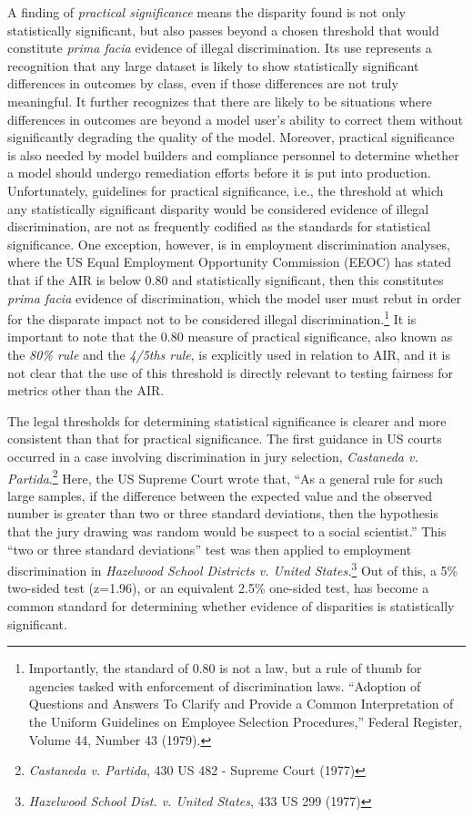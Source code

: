 \documentclass[information,article,submit,moreauthors,pdftex]{definitions/mdpi}
\begin{document}
A finding of \textit{practical significance} means the disparity found is not only statistically significant, but also passes beyond a chosen threshold that would constitute \textit{prima facia} evidence of illegal discrimination.  Its use represents a recognition that any large dataset is likely to show statistically significant differences in outcomes by class, even if those differences are not truly meaningful.  It further recognizes that there are likely to be situations where differences in outcomes are beyond a model user’s ability to correct them without significantly degrading the quality of the model. Moreover, practical significance is also needed by model builders and compliance personnel to determine whether a model should undergo remediation efforts before it is put into production. Unfortunately, guidelines for practical significance, i.e., the threshold at which any statistically significant disparity would be considered evidence of illegal discrimination, are not as frequently codified as the standards for statistical significance.  One exception, however, is in employment discrimination analyses, where the US Equal Employment Opportunity Commission (EEOC) has stated that if the AIR is below 0.80 and statistically significant, then this constitutes \textit{prima facia} evidence of discrimination, which the model user must rebut in order for the disparate impact not to be considered illegal discrimination.\footnote{Importantly, the standard of 0.80 is not a law, but a rule of thumb for agencies tasked with enforcement of discrimination laws.  ``Adoption of Questions and Answers To Clarify and Provide a Common Interpretation of the Uniform Guidelines on Employee Selection Procedures,'' Federal Register, Volume 44, Number 43 (1979).} It is important to note that the 0.80 measure of practical significance, also known as the \textit{80\% rule} and the \textit{4/5ths rule}, is explicitly used in relation to AIR, and it is not clear that the use of this threshold is directly relevant to testing fairness for metrics other than the AIR.

The legal thresholds for determining statistical significance is clearer and more consistent than that for practical significance.  The first guidance in US courts occurred in a case involving discrimination in jury selection, \textit{Castaneda v. Partida}.\footnote{\textit{Castaneda v. Partida}, 430 US 482 - Supreme Court (1977)}   Here, the US Supreme Court wrote that, ``As a general rule for such large samples, if the difference between the expected value and the observed number is greater than two or three standard deviations, then the hypothesis that the jury drawing was random would be suspect to a social scientist.''  This ``two or three standard deviations'' test was then applied to employment discrimination in \textit{Hazelwood School Districts v. United States.}\footnote{\textit{Hazelwood School Dist. v. United States}, 433 US 299 (1977)} Out of this, a 5\% two-sided test (z=1.96), or an equivalent 2.5\% one-sided test, has become a common standard for determining whether evidence of disparities is statistically significant.
\end{document}

